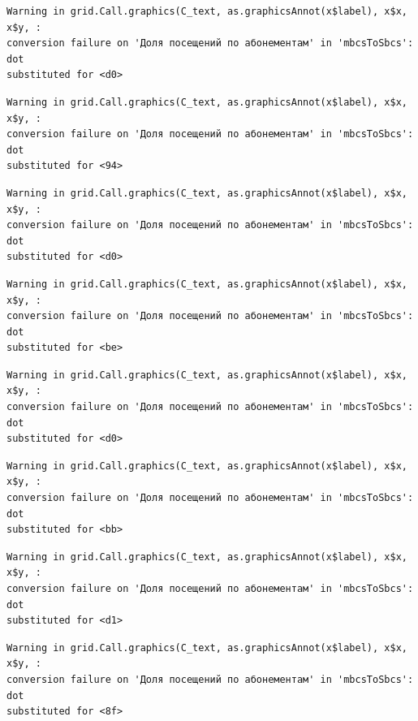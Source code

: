 \documentclass[
  letterpaper,
  DIV=11,
  numbers=noendperiod]{scrartcl}
\begin{document}
\begin{verbatim}
Warning in grid.Call.graphics(C_text, as.graphicsAnnot(x$label), x$x, x$y, :
conversion failure on 'Доля посещений по абонементам' in 'mbcsToSbcs': dot
substituted for <d0>
\end{verbatim}

\begin{verbatim}
Warning in grid.Call.graphics(C_text, as.graphicsAnnot(x$label), x$x, x$y, :
conversion failure on 'Доля посещений по абонементам' in 'mbcsToSbcs': dot
substituted for <94>
\end{verbatim}

\begin{verbatim}
Warning in grid.Call.graphics(C_text, as.graphicsAnnot(x$label), x$x, x$y, :
conversion failure on 'Доля посещений по абонементам' in 'mbcsToSbcs': dot
substituted for <d0>
\end{verbatim}

\begin{verbatim}
Warning in grid.Call.graphics(C_text, as.graphicsAnnot(x$label), x$x, x$y, :
conversion failure on 'Доля посещений по абонементам' in 'mbcsToSbcs': dot
substituted for <be>
\end{verbatim}

\begin{verbatim}
Warning in grid.Call.graphics(C_text, as.graphicsAnnot(x$label), x$x, x$y, :
conversion failure on 'Доля посещений по абонементам' in 'mbcsToSbcs': dot
substituted for <d0>
\end{verbatim}

\begin{verbatim}
Warning in grid.Call.graphics(C_text, as.graphicsAnnot(x$label), x$x, x$y, :
conversion failure on 'Доля посещений по абонементам' in 'mbcsToSbcs': dot
substituted for <bb>
\end{verbatim}

\begin{verbatim}
Warning in grid.Call.graphics(C_text, as.graphicsAnnot(x$label), x$x, x$y, :
conversion failure on 'Доля посещений по абонементам' in 'mbcsToSbcs': dot
substituted for <d1>
\end{verbatim}

\begin{verbatim}
Warning in grid.Call.graphics(C_text, as.graphicsAnnot(x$label), x$x, x$y, :
conversion failure on 'Доля посещений по абонементам' in 'mbcsToSbcs': dot
substituted for <8f>
\end{verbatim}
\end{document}
